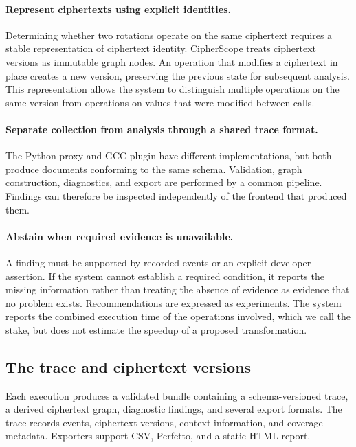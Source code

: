 \documentclass[sigconf,nonacm]{acmart}
\begin{document}
\paragraph{Represent ciphertexts using explicit identities.} Determining
whether two rotations operate on the same ciphertext requires a stable
representation of ciphertext identity. CipherScope treats ciphertext versions
as immutable graph nodes. An operation that modifies a ciphertext in place
creates a new version, preserving the previous state for subsequent analysis.
This representation allows the system to distinguish multiple operations on
the same version from operations on values that were modified between calls.

\paragraph{Separate collection from analysis through a shared trace format.}
The Python proxy and GCC plugin have different implementations, but both
produce documents conforming to the same schema. Validation, graph
construction, diagnostics, and export are performed by a common pipeline.
Findings can therefore be inspected independently of the frontend that
produced them.

\paragraph{Abstain when required evidence is unavailable.} A finding must be
supported by recorded events or an explicit developer assertion. If the
system cannot establish a required condition, it reports the missing
information rather than treating the absence of evidence as evidence that no
problem exists. Recommendations are expressed as experiments. The system
reports the combined execution time of the operations involved, which we call
the stake, but does not estimate the speedup of a proposed transformation.

\subsection{The trace and ciphertext versions}
\label{sec:trace}

Each execution produces a validated bundle containing a schema-versioned
trace, a derived ciphertext graph, diagnostic findings, and several export
formats. The trace records events, ciphertext versions, context information,
and coverage metadata. Exporters support CSV, Perfetto, and a static HTML
report.
\end{document}
